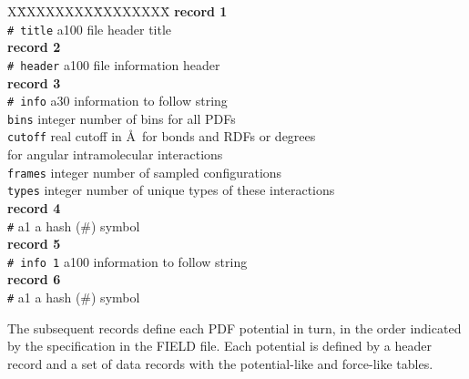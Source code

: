 \begin{tabbing}
X\=XXXXXXXX\=XXXXXXXX\=\kill
{\bf record 1} \\
\> {\tt \# title}  \> a100    \> file header title \\
{\bf record 2} \\
\> {\tt \# header} \> a100    \> file information header \\
{\bf record 3} \\
\> {\tt \# info}   \> a30     \> information to follow string \\
\> {\tt bins}   \> integer \> number of bins for all PDFs \\
\> {\tt cutoff} \> real    \> cutoff in \AA~for bonds and RDFs or degrees \\
\>                 \>         \> for angular intramolecular interactions \\
\> {\tt frames} \> integer \> number of sampled configurations \\
\> {\tt types}  \> integer \> number of unique types of these interactions \\
{\bf record 4} \\
\> {\tt \#}        \> a1      \> a hash (\#) symbol \\
{\bf record 5} \\
\> {\tt \# info 1} \> a100    \> information to follow string \\
{\bf record 6} \\
\> {\tt \#}        \> a1      \> a hash (\#) symbol
\end{tabbing}

The subsequent records define each PDF potential in turn,
in the order indicated by the specification in the FIELD file.
Each potential is defined by a header record and a set of data
records with the potential-like and force-like tables.

